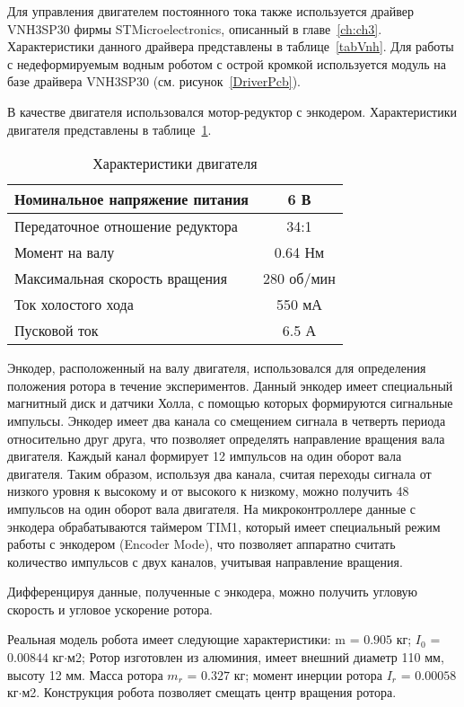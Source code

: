 Для управления двигателем постоянного тока также используется драйвер VNH3SP30 фирмы STMicroelectronics, описанный в главе~\ref{ch:ch3}. Характеристики данного драйвера представлены в таблице~\ref{tabVnh}. Для работы с недеформируемым водным роботом с острой кромкой используется модуль на базе драйвера VNH3SP30 (см. рисунок~\ref{DriverPcb}). 


В качестве двигателя использовался мотор-редуктор с энкодером. Характеристики двигателя представлены в таблице~\ref{tabMotor2}. 

\begin{table}[h]
	\centering
	\caption{Характеристики двигателя}\label{tabMotor2}
	\begin{tabular}{|l|c|}
		\hline
		Номинальное напряжение питания & 6 В \\ \hline
		Передаточное отношение редуктора & 34:1 \\ \hline
		Момент на валу & 0.64 Нм\\ \hline
		Максимальная скорость вращения & 280 об/мин \\ \hline
		Ток холостого хода & 550 мА\\ \hline
		Пусковой ток & 6.5 А \\ \hline
	\end{tabular}
\end{table}


Энкодер, расположенный на валу двигателя, использовался для определения положения ротора в течение экспериментов. Данный энкодер имеет специальный магнитный диск и датчики Холла, с помощью которых формируются сигнальные импульсы. Энкодер имеет два канала со смещением сигнала в четверть периода относительно друг друга, что позволяет определять направление вращения вала двигателя. Каждый канал формирует 12 импульсов на один оборот вала двигателя. Таким образом, используя два канала, считая переходы сигнала от низкого уровня к высокому и от высокого к низкому, можно получить 48 импульсов на один оборот вала двигателя. На микроконтроллере данные с энкодера обрабатываются таймером TIM1, который имеет специальный режим работы с энкодером (Encoder Mode), что позволяет аппаратно считать количество импульсов с двух каналов, учитывая направление вращения. 

Дифференцируя данные, полученные с энкодера, можно получить угловую скорость и угловое ускорение ротора.






Реальная модель робота имеет следующие характеристики: m = $0.905$ кг; $I_0$ = $0.00844$ кг$\cdot$м2; Ротор изготовлен из алюминия, имеет внешний диаметр 110 мм, высоту 12 мм. Масса ротора $m_r$ = $0.327$ кг; момент инерции ротора $I_r$ = $0.00058$ кг$\cdot$м2. Конструкция робота позволяет смещать центр вращения ротора.

